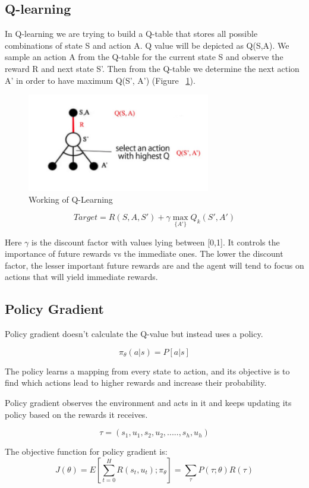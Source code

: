 \documentclass[12pt]{report}
\begin{document}
\subsection{Q-learning} In Q-learning we are trying to build a Q-table that stores all possible combinations of state S and action A. Q value will be depicted as Q(S,A). We sample an action A from the Q-table for the current state S and observe the reward R and next state S'. Then from the Q-table we determine the next action A' in order to have maximum Q(S', A') (Figure ~\ref{fig:QLearning}). 

\begin{figure}[!h]
    \centering
    \includegraphics[width=8cm]{QLearning.png}
    \caption{Working of Q-Learning}
    \label{fig:QLearning}
\end{figure}

\[ Target = R(S,A,S') + \gamma \max_{\{A'\}} Q_k (S', A')  \] 

Here $\gamma$ is the discount factor with values lying between [0,1]. It controls the importance of future rewards vs the immediate ones. The lower the discount factor, the lesser important future rewards are and the agent will tend to focus on actions that will yield immediate rewards.    

\subsection{Policy Gradient} Policy gradient doesn't calculate the Q-value but instead uses a policy. 

\[ \pi_\theta (a | s) = P [ a | s ] \]

The policy learns a mapping from every state to action, and its objective is to find which actions lead to higher rewards and increase their probability. 

Policy gradient observes the environment and acts in it and keeps updating its policy based on the rewards it receives. 

\[ \tau = (s_1, u_1, s_2, u_2, ....., s_h, u_h ) \]

The objective function for policy gradient is:
\[ J(\theta) = E[\sum_{t=0}^{H} R(s_t, u_t); \pi_\theta] = \sum_{\tau} P(\tau;\theta) R(\tau) \] 
\end{document}
